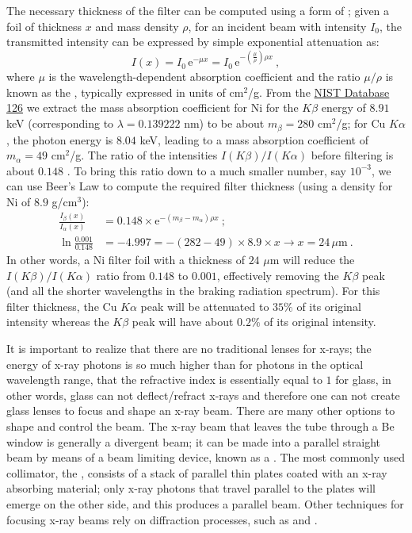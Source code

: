 The necessary thickness of the filter can be computed using a form of ; given a foil of thickness $x$ and mass density $\rho$, for an incident beam with intensity $I_0$, the transmitted intensity can be expressed by simple exponential attenuation as:
\[
	I(x) = I_0\,\mathrm{e}^{-\mu x} = I_0\,\mathrm{e}^{-\left(\frac{\mu}{\rho}\right) \rho x}\ ,
\]
where $\mu$ is the wavelength-dependent absorption coefficient and the ratio $\mu/\rho$ is known as the , typically expressed in units of cm$^2$/g. From the \href{https://physics.nist.gov/PhysRefData/XrayMassCoef/ElemTab/z28.html}{NIST Database 126}  we extract the mass absorption coefficient for Ni for the $K\beta$ energy of $8.91$ keV (corresponding to $\lambda=0.139222$ nm) to be about $m_{\beta}=280$ cm$^2$/g; for Cu $K\alpha$, the photon energy is $8.04$ keV, leading to a mass absorption coefficient of $m_{\alpha}=49$ cm$^2$/g.  The ratio of the intensities $I(K\beta)/I(K\alpha)$ before filtering is about $0.148$ \cite{ito2023a}.  To bring this ratio down to a much smaller number, say $10^{-3}$, we can use Beer's Law to compute the required filter thickness (using a density for Ni of $8.9$ g/cm$^3$):
\begin{equation*}
\begin{split}
	\frac{I_{\beta}(x)}{I_{\alpha}(x)} &= 0.148\times \mathrm{e}^{-(m_{\beta}-m_{\alpha})\rho x}\ ;\\
	\ln\frac{0.001}{0.148} &= -4.997 = -(282-49)\times 8.9\times x\rightarrow x=24\, \mu\text{m}\ .
\end{split}
\end{equation*}
In other words, a Ni filter foil with a thickness of $24$ $\mu$m will reduce the $I(K\beta)/I(K\alpha)$ ratio from $0.148$ to $0.001$, effectively removing the $K\beta$ peak (and all the shorter wavelengths in the braking radiation spectrum). For this filter thickness, the Cu $K\alpha$ peak will be attenuated to $35\%$ of its original intensity whereas the $K\beta$ peak will have about $0.2\%$ of its original intensity.  

It is important to  realize that there are no traditional lenses for x-rays; the energy of x-ray photons is so much higher than for photons in the optical wavelength range, that the refractive index is essentially equal to $1$ for glass, in other words, glass can not deflect/refract x-rays and therefore one can not create glass lenses to focus and shape an x-ray beam.  There are many other options to shape and control the beam.  The x-ray beam that leaves the tube through a Be window is generally a divergent beam; it can be made into a parallel straight beam by means of a beam limiting device, known as a . The most commonly used collimator, the , consists of a stack of parallel thin plates coated with an x-ray absorbing material; only x-ray photons that travel parallel to the plates will emerge on the other side, and this produces a parallel beam.  Other techniques for focusing x-ray beams rely on diffraction processes, such as  and .

